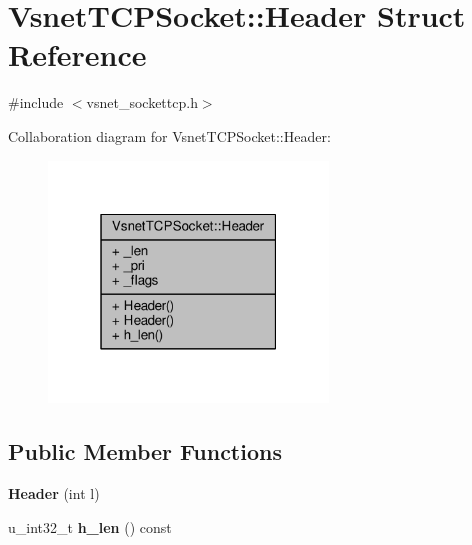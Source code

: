 \hypertarget{structVsnetTCPSocket_1_1Header}{}\section{Vsnet\+T\+C\+P\+Socket\+:\+:Header Struct Reference}
\label{structVsnetTCPSocket_1_1Header}


{\ttfamily \#include $<$vsnet\+\_\+sockettcp.\+h$>$}



Collaboration diagram for Vsnet\+T\+C\+P\+Socket\+:\+:Header\+:
\nopagebreak
\begin{figure}[H]
\begin{center}
\leavevmode
\includegraphics[width=211pt]{de/d40/structVsnetTCPSocket_1_1Header__coll__graph}
\end{center}
\end{figure}
\subsection*{Public Member Functions}
\begin{DoxyCompactItemize}
\item 
{\bfseries Header} (int l)\hypertarget{structVsnetTCPSocket_1_1Header_ad75e28f33e81bcc782fa5cb2b3d57427}{}\label{structVsnetTCPSocket_1_1Header_ad75e28f33e81bcc782fa5cb2b3d57427}

\item 
u\+\_\+int32\+\_\+t {\bfseries h\+\_\+len} () const \hypertarget{structVsnetTCPSocket_1_1Header_ab8f53366ab5080e4e409da8ee3a890b4}{}\label{structVsnetTCPSocket_1_1Header_ab8f53366ab5080e4e409da8ee3a890b4}

\end{DoxyCompactItemize}
